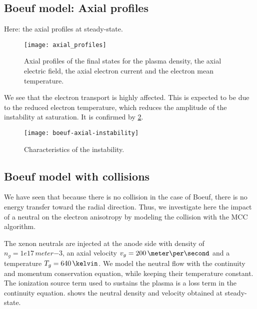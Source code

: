 \subsection{Boeuf model: Axial profiles} \label{subsec-axial_boeuf}

Here: the axial profiles at steady-state.

\begin{figure}[hbtp]
  \centering
  \texttt{[image: axial\_profiles]}
  \caption{Axial profiles of the final states for the plasma density, the axial electric field, the axial electron current and the electron mean temperature. }
  \label{fig-boeuf_axial}
\end{figure}

We see that the electron transport is highly affected.
This is expected to be due to the reduced electron temperature, which reduces the amplitude of the instability at saturation.
It is confirmed by \cref{fig-boeuf-instability}.

\begin{figure}[hbtp]
  \centering
  \texttt{[image: boeuf-axial-instability]}
  \caption{Characteristics of the instability.}
  \label{fig-boeuf-instability}
\end{figure}




\subsection{Boeuf model with collisions} \label{subsec-MCC_boeuf}

We have seen that because there is no collision in the case of Boeuf, there is no energy transfer toward the radial direction.
Thus, we investigate here the impact of a neutral on the electron anisotropy by modeling the collision with the \ac{MCC} algorithm.

The xenon neutrals are injected at the anode side with density of $n_g=1e17\,meter$${-3}$, an axial velocity $v_g = 200 \,\meter\per\second$ and a temperature $T_g=640\,\kelvin$.
We model the neutral flow with the continuity and momentum conservation equation, while keeping their temperature constant.
The ionization source term used to sustains the plasma is a loss term in the continuity equation.
 shows the neutral density and velocity obtained at steady-state.

